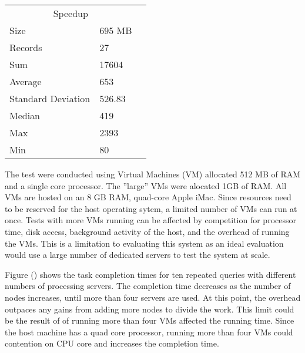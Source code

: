 \documentclass{article}
\begin{document}
\begin{multicols}{2}
\begin{tabular}{llr}
\hline
\multicolumn{2}{c}{Speedup} \\
\cline{1-2}
Size & 695 MB \\
Records & 27 \\
Sum & 17604 \\
Average & 653 \\ 
Standard Deviation & 526.83 \\
Median & 419 \\
Max & 2393 \\
Min & 80 \\
\hline
\end{tabular}




The test were conducted using Virtual Machines (VM) allocated 512 MB of RAM and a single core processor. The ''large'' VMs were alocated 1GB of RAM.  All VMs are hosted on an 8 GB RAM, quad-core Apple iMac. Since resources need to be reserved for the host operating sytem, a limited number of VMs can run at once.  Tests with more VMs running can be affected by competition for processor time, disk access, background activity of the host, and the overhead of running the VMs.  This is a limitation to evaluating this system as an ideal evaluation would use a large number of dedicated servers to test the system at scale.

Figure () shows the task completion times for ten repeated queries with different numbers of processing servers.  The completion time decreases as the number of nodes increases, until more than four servers are used.  At this point, the overhead outpaces any gains from adding more nodes to divide the work.  This limit could be the result of of running more than four VMs affected the running time.  Since the host machine has a quad core processor, running more than four VMs could contention on CPU core and increases the completion time.


\end{multicols}
\end{document}
